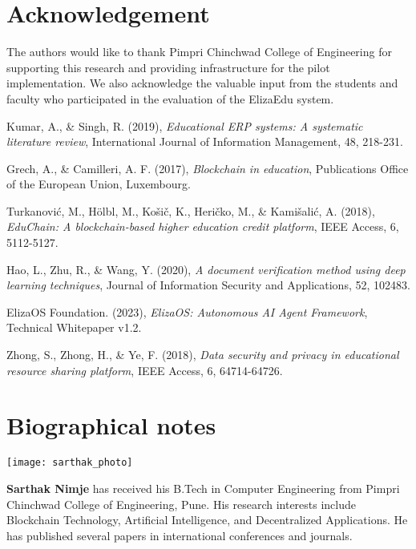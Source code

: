 \documentclass[a4paper,12pt]{article}
\begin{document}
\section*{Acknowledgement}
The authors would like to thank Pimpri Chinchwad College of Engineering for supporting this research and providing infrastructure for the pilot implementation. We also acknowledge the valuable input from the students and faculty who participated in the evaluation of the ElizaEdu system.


\begin{thebibliography}{10}

Kumar, A., \& Singh, R. (2019),
\textit{Educational ERP systems: A systematic literature review},
International Journal of Information Management, 48, 218-231.

Grech, A., \& Camilleri, A. F. (2017),
\textit{Blockchain in education},
Publications Office of the European Union, Luxembourg.

Turkanović, M., Hölbl, M., Košič, K., Heričko, M., \& Kamišalić, A. (2018),
\textit{EduChain: A blockchain-based higher education credit platform},
IEEE Access, 6, 5112-5127.

Hao, L., Zhu, R., \& Wang, Y. (2020),
\textit{A document verification method using deep learning techniques},
Journal of Information Security and Applications, 52, 102483.

ElizaOS Foundation. (2023),
\textit{ElizaOS: Autonomous AI Agent Framework},
Technical Whitepaper v1.2.

Zhong, S., Zhong, H., \& Ye, F. (2018),
\textit{Data security and privacy in educational resource sharing platform},
IEEE Access, 6, 64714-64726.

\end{thebibliography}

\section*{Biographical notes}

\begin{minipage}{0.2\textwidth}
\texttt{[image: sarthak\_photo]}
\end{minipage}
\begin{minipage}{0.75\textwidth}
\textbf{Sarthak Nimje} has received his B.Tech in Computer Engineering from Pimpri Chinchwad College of Engineering, Pune. His research interests include Blockchain Technology, Artificial Intelligence, and Decentralized Applications. He has published several papers in international conferences and journals.
\end{minipage}
\end{document}
